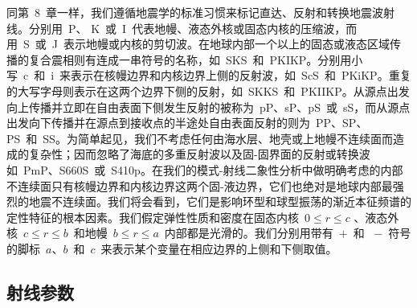 同第~8~章一样，我们遵循地震学的标准习惯来标记直达、反射和转换地震波射线。分别用~P、 K~或~I~代表地幔、液态外核或固态内核的压缩波，而用~S~或~J~表示地幔或内核的剪切波。在地球内部一个以上的固态或液态区域传播的复合震相则有连成一串符号的名称，如~SKS~和~PKIKP。分别用小写~c~和~i~来表示在核幔边界和内核边界上侧的反射波，如~ScS~和~PKiKP。重复的大写字母则表示在这两个边界下侧的反射，如~SKKS~和~PKIIKP。从源点出发向上传播并立即在自由表面下侧发生反射的被称为~pP、sP、pS~或~sS，而从源点出发向下传播并在源点到接收点的半途处自由表面反射的则为~PP、SP、PS~和~SS。为简单起见，我们不考虑任何由海水层、地壳或上地幔不连续面而造成的复杂性；因而忽略了海底的多重反射波以及固-固界面的反射或转换波如~PmP、S{\scriptsize 660}S~或~S{\scriptsize 410}p。在我们的模式-射线二象性分析中做明确考虑的内部不连续面只有核幔边界和内核边界这两个固-液边界，它们也绝对是地球内部最强烈的地震不连续面。我们将会看到，它们是影响环型和球型振荡的渐近本征频谱的定性特征的根本因素。我们假定弹性性质和密度在固态内核~$0\leq r\leq c$
、液态外核~$c\leq r\leq b$~和地幔~$b\leq r\leq a$~内部都是光滑的。我们分别用带有~$+$~和 ~$-$~符号的脚标~$a$、$b$~和~$c$~来表示某个变量在相应边界的上侧和下侧取值。

\subsection{射线参数}
%

